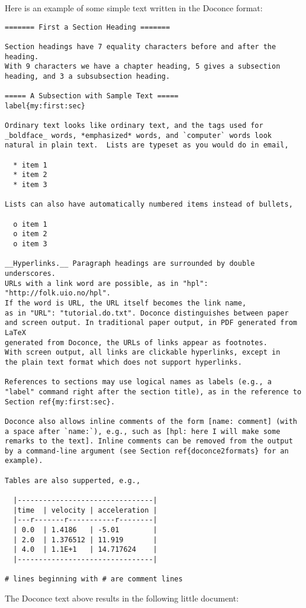 \documentclass[%
oneside,                 %
final,                   %
10pt]{article}
\begin{document}
Here is an example of some simple text written in the Doconce format:
\begin{Verbatim}[fontsize=\fontsize{9pt}{9pt},tabsize=8,baselinestretch=0.85,fontfamily=tt,xleftmargin=7mm]
======= First a Section Heading =======

Section headings have 7 equality characters before and after the heading.
With 9 characters we have a chapter heading, 5 gives a subsection
heading, and 3 a subsubsection heading.

===== A Subsection with Sample Text =====
label{my:first:sec}

Ordinary text looks like ordinary text, and the tags used for
_boldface_ words, *emphasized* words, and `computer` words look
natural in plain text.  Lists are typeset as you would do in email,

  * item 1
  * item 2
  * item 3

Lists can also have automatically numbered items instead of bullets,

  o item 1
  o item 2
  o item 3

__Hyperlinks.__ Paragraph headings are surrounded by double underscores.
URLs with a link word are possible, as in "hpl": "http://folk.uio.no/hpl".
If the word is URL, the URL itself becomes the link name,
as in "URL": "tutorial.do.txt". Doconce distinguishes between paper
and screen output. In traditional paper output, in PDF generated from LaTeX
generated from Doconce, the URLs of links appear as footnotes.
With screen output, all links are clickable hyperlinks, except in
the plain text format which does not support hyperlinks.

References to sections may use logical names as labels (e.g., a
"label" command right after the section title), as in the reference to
Section ref{my:first:sec}.

Doconce also allows inline comments of the form [name: comment] (with
a space after `name:`), e.g., such as [hpl: here I will make some
remarks to the text]. Inline comments can be removed from the output
by a command-line argument (see Section ref{doconce2formats} for an
example).

Tables are also supperted, e.g.,

  |--------------------------------|
  |time  | velocity | acceleration |
  |---r-------r-----------r--------|
  | 0.0  | 1.4186   | -5.01        |
  | 2.0  | 1.376512 | 11.919       |
  | 4.0  | 1.1E+1   | 14.717624    |
  |--------------------------------|

# lines beginning with # are comment lines
\end{Verbatim}
\noindent
The Doconce text above results in the following little document:
\end{document}

